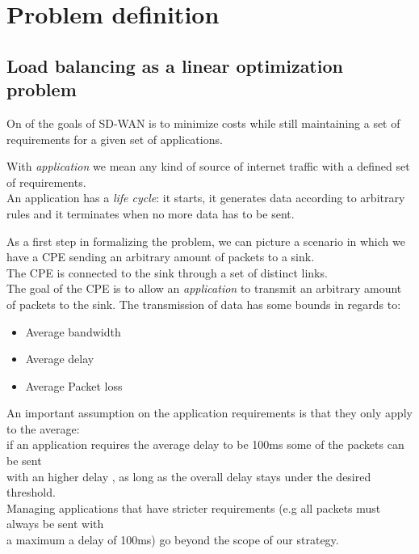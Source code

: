 
\chapter{Problem definition}

\section{Load balancing as a linear optimization problem}

On of the goals of SD-WAN is to minimize costs while still maintaining a set of requirements for a given set of applications. 


\begin{mdframed}[hidealllines=true,backgroundcolor=blue!20]
	With \textit{application} we mean any kind of source of internet traffic with a defined set of requirements. \\
	An application has a \textit{life cycle}: it starts, it generates data according to arbitrary rules and it terminates when no more data has to be sent. 
\end{mdframed} 


As a first step in formalizing the problem,  we can picture a scenario in which we have a CPE sending an arbitrary amount of packets to a sink. \\

The CPE is connected to the sink through a set of distinct links. \\

The goal of the CPE is to allow an \textit{application} to  transmit an arbitrary amount of packets to the sink. The transmission of data has some bounds in regards to:

\begin{itemize}
	\item Average bandwidth
	\item Average delay
	\item Average Packet loss
\end{itemize}


\begin{mdframed}[hidealllines=true,backgroundcolor=blue!20]
	An important assumption on the application requirements is that they only apply to the average: \\ if an application requires the average delay to be 100ms some of the packets can be sent \\ with an higher delay , as long as the overall delay stays under the desired threshold. \\
	Managing applications that have stricter requirements (e.g all packets must always be sent with \\ a maximum a delay of 100ms) go beyond the scope of our strategy.
\end{mdframed} 




